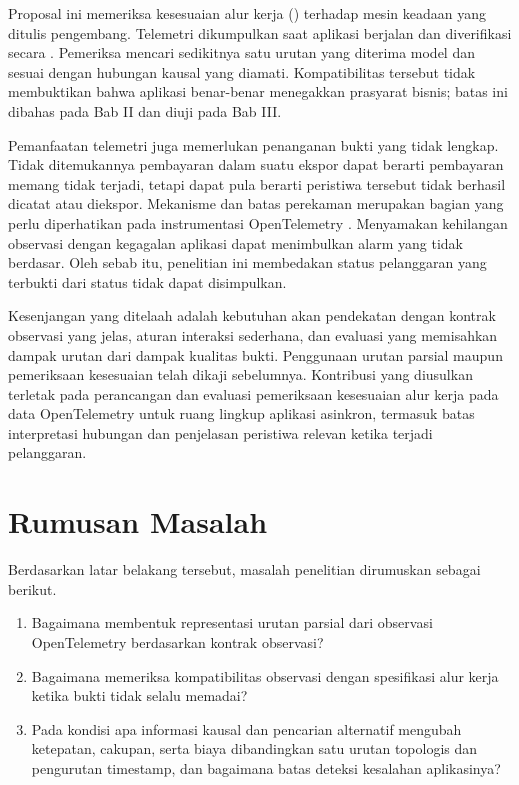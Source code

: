 Proposal ini memeriksa kesesuaian alur kerja () terhadap mesin keadaan yang ditulis pengembang. Telemetri dikumpulkan saat aplikasi berjalan dan diverifikasi secara . Pemeriksa mencari sedikitnya satu urutan yang diterima model dan sesuai dengan hubungan kausal yang diamati. Kompatibilitas tersebut tidak membuktikan bahwa aplikasi benar-benar menegakkan prasyarat bisnis; batas ini dibahas pada Bab II dan diuji pada Bab III.

Pemanfaatan telemetri juga memerlukan penanganan bukti yang tidak lengkap. Tidak ditemukannya pembayaran dalam suatu ekspor dapat berarti pembayaran memang tidak terjadi, tetapi dapat pula berarti peristiwa tersebut tidak berhasil dicatat atau diekspor. Mekanisme  dan batas perekaman merupakan bagian yang perlu diperhatikan pada instrumentasi OpenTelemetry \citep{otelsdk}. Menyamakan kehilangan observasi dengan kegagalan aplikasi dapat menimbulkan alarm yang tidak berdasar. Oleh sebab itu, penelitian ini membedakan status pelanggaran yang terbukti dari status tidak dapat disimpulkan.

Kesenjangan yang ditelaah adalah kebutuhan akan pendekatan dengan kontrak observasi yang jelas, aturan interaksi sederhana, dan evaluasi yang memisahkan dampak urutan  dari dampak kualitas bukti. Penggunaan urutan parsial maupun pemeriksaan kesesuaian telah dikaji sebelumnya. Kontribusi yang diusulkan terletak pada perancangan dan evaluasi pemeriksaan kesesuaian alur kerja pada data OpenTelemetry untuk ruang lingkup aplikasi asinkron, termasuk batas interpretasi hubungan  dan penjelasan peristiwa relevan ketika terjadi pelanggaran.

\section{Rumusan Masalah}
Berdasarkan latar belakang tersebut, masalah penelitian dirumuskan sebagai berikut.
\begin{enumerate}
  \item Bagaimana membentuk representasi urutan parsial dari observasi OpenTelemetry berdasarkan kontrak observasi?
  \item Bagaimana memeriksa kompatibilitas observasi dengan spesifikasi alur kerja ketika bukti tidak selalu memadai?
  \item Pada kondisi apa informasi kausal dan pencarian alternatif mengubah ketepatan, cakupan, serta biaya dibandingkan satu urutan topologis dan pengurutan timestamp, dan bagaimana batas deteksi kesalahan aplikasinya?
\end{enumerate}

